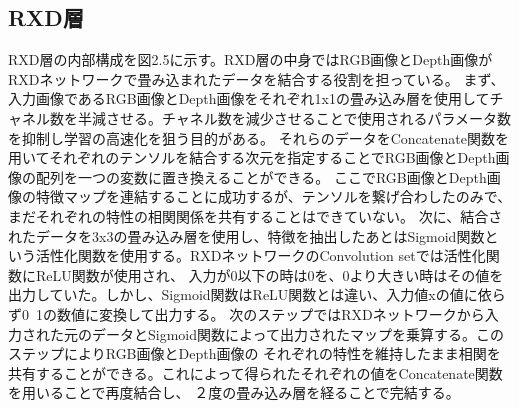 \subsection{RXD層}
RXD層の内部構成を図2.5に示す。RXD層の中身ではRGB画像とDepth画像がRXDネットワークで畳み込まれたデータを結合する役割を担っている。
まず、入力画像であるRGB画像とDepth画像をそれぞれ1x1の畳み込み層を使用してチャネル数を半減させる。チャネル数を減少させることで使用されるパラメータ数を抑制し学習の高速化を狙う目的がある。
それらのデータをConcatenate関数を用いてそれぞれのテンソルを結合する次元を指定することでRGB画像とDepth画像の配列を一つの変数に置き換えることができる。
ここでRGB画像とDepth画像の特徴マップを連結することに成功するが、テンソルを繋げ合わしたのみで、まだそれぞれの特性の相関関係を共有することはできていない。
次に、結合されたデータを3x3の畳み込み層を使用し、特徴を抽出したあとはSigmoid関数という活性化関数を使用する。RXDネットワークのConvolution setでは活性化関数にReLU関数が使用され、
入力が0以下の時は0を、0より大きい時はその値を出力していた。しかし、Sigmoid関数はReLU関数とは違い、入力値xの値に依らず0~1の数値に変換して出力する。
次のステップではRXDネットワークから入力された元のデータとSigmoid関数によって出力されたマップを乗算する。このステップによりRGB画像とDepth画像の
それぞれの特性を維持したまま相関を共有することができる。これによって得られたそれぞれの値をConcatenate関数を用いることで再度結合し、
２度の畳み込み層を経ることで完結する。

